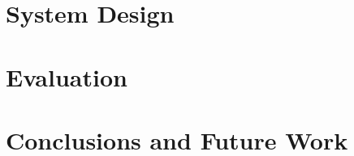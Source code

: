 \documentclass[a4paper, 11pt]{article}
\begin{document}
\pagebreak

\section{System Design}

\pagebreak

\section{Evaluation}

\pagebreak

\section{Conclusions and Future Work}

\nocite{*} %

\end{document}
